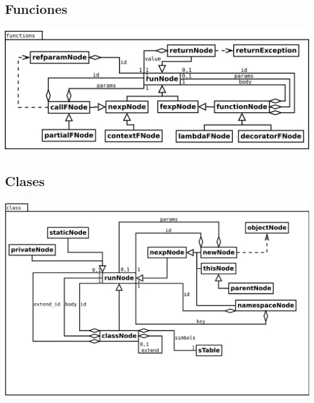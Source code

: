 \subsection {Funciones}
\begin{center}
\includegraphics[scale=0.4]{functions.png} \\
\end{center}

\subsection {Clases}
\begin{center}
\includegraphics[scale=0.4]{class.png} \\
\end{center}

